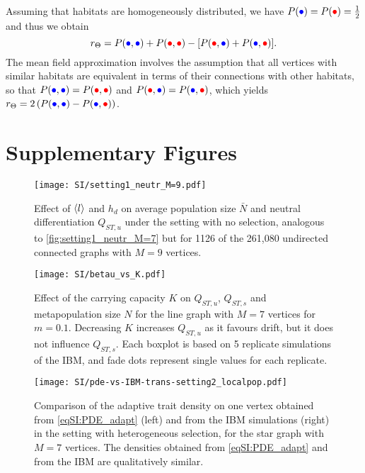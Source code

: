 Assuming that habitats are homogeneously distributed, we have $P(\bcirc) = P(\rcirc) = \frac{1}{2}$ and thus we obtain
\begin{equation}\label{eqSI:r_theta_homo}
  r_\Theta =   P(\bcirc,\bcirc) + P(\rcirc,\rcirc)   -  [ P(\rcirc,\bcirc) + P(\bcirc,\rcirc)].
\end{equation}
%
The mean field approximation involves the assumption that all vertices with similar habitats are equivalent in terms of their connections with other habitats, so that $P(\bcirc,\bcirc) = P(\rcirc,\rcirc)$ and $P(\rcirc,\bcirc) = P(\bcirc,\rcirc)$, which yields $r_\Theta = 2 \left( P({\bcirc},{\bcirc}) - P({\bcirc},{\rcirc}) \right)$.

\printbibliography[heading=subbibliography]

\clearpage


\section{Supplementary Figures}

\begin{figure}[t]
  \centerline{
      \texttt{[image: SI/setting1\_neutr\_M=9.pdf]} 
  }
  \caption{Effect of $\langle l \rangle$ and $h_d$ on average population size $\bar{N}$ and neutral differentiation $Q_{ST,u}$ under the setting with no selection, analogous to \cref{fig:setting1_neutr_M=7} but for 1126 of the 261,080 undirected connected graphs with $M=9$ vertices.}
  \label{figSI:setting1_neutr_M=9}
\end{figure}
\FloatBarrier


\begin{figure}[t]
  \centering
    \texttt{[image: SI/betau\_vs\_K.pdf]}
    \caption{Effect of the carrying capacity $K$ on $Q_{ST,u}$, $Q_{ST,s}$ and metapopulation size $N$ for the line graph with $M=7$ vertices for $m=0.1$. Decreasing $K$ increases $Q_{ST,u}$ as it favours drift, but it does not influence $Q_{ST,s}$. Each boxplot is based on 5 replicate simulations of the IBM, and fade dots represent single values for each replicate.}\label{figSI:betau_vs_K}
\end{figure}

\FloatBarrier

\begin{figure}[t]
  \centerline{
      \texttt{[image: SI/pde-vs-IBM-trans-setting2\_localpop.pdf]}}
    \caption{ Comparison of the adaptive trait density on one vertex obtained from \cref{eqSI:PDE_adapt} (left) and from the IBM simulations (right) in the setting with heterogeneous selection, for the star graph with $M=7$ vertices. The densities obtained from \cref{eqSI:PDE_adapt} and from the IBM are qualitatively similar.}
    \label{figSI:pde-vs-IBM-trans-setting2_localpop}
\end{figure}
\FloatBarrier

